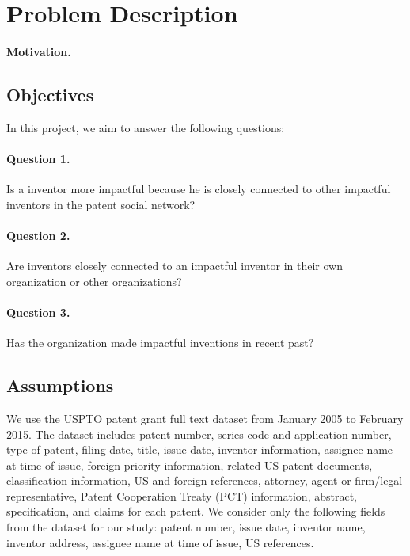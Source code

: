 \section{Problem Description}

\paragraph{Motivation.}


\subsection{Objectives}
 
In this project, we aim to answer the following questions:

\paragraph{Question 1.} Is a inventor more impactful because he is closely
connected to other impactful inventors in the patent social network? 

\paragraph{Question  2.} Are inventors closely connected to an impactful
inventor in their own organization or other organizations? %

\paragraph{Question  3.} Has the organization made impactful inventions in
recent past? %


\subsection{Assumptions}

We use the USPTO patent grant full text dataset from January 2005 to February
2015.  The dataset includes patent number, series code and application number,
type of patent, filing date, title, issue date, inventor information, assignee
name at time of issue, foreign priority information, related US patent
documents, classification information, US and foreign references, attorney,
agent or firm/legal representative, Patent Cooperation Treaty (PCT)
information, abstract, specification, and claims for each patent. We consider
only the following fields from the dataset for our study: patent number, issue
date, inventor name, inventor address, assignee name at time of issue, US
references.


